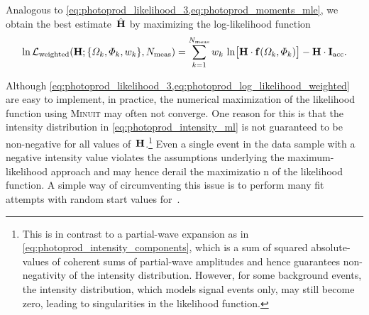 Analogous to
\cref{eq:photoprod_likelihood_3,eq:photoprod_moments_mle}, we obtain
the best estimate~$\hat{\bm{\mathrm{H}}}$ by maximizing the log-likelihood
function
\begin{equation}
  \label{eq:photoprod_log_likelihood_weighted}
  \ln \mathcal{L}_\text{weighted}(\vect{H}; \set{\Omega_k, \Phi_k, w_k}, N_\text{meas})
  = \sum_{k = 1}^{N_\text{meas}} w_k\, \ln\!\sBrk[1]{\vect{H} \cdot \vect{f}(\Omega_k, \Phi_k)}
  - \vect{H} \cdot \vect{I}_\text{acc}.
\end{equation}

Although
\cref{eq:photoprod_likelihood_3,eq:photoprod_log_likelihood_weighted}
are easy to implement, in practice, the numerical maximization of the
likelihood function using \textsc{Minuit} may often not converge.  One
reason for this is that the intensity distribution in
\cref{eq:photoprod_intensity_ml} is not guaranteed to be non-negative
for all values of~$\bm{\mathrm{H}}$.\footnote{This is in contrast to a
partial-wave expansion as in \cref{eq:photoprod_intensity_components},
which is a sum of squared absolute-values of coherent sums of
partial-wave amplitudes and hence guarantees non-negativity of the
intensity distribution.  However, for some background events, the
intensity distribution, which models signal events only, may still
become zero, leading to singularities in the likelihood function.}
Even a single event in the data sample with a negative intensity value
violates the assumptions underlying the maximum-likelihood approach
and may hence derail the maximizatio  n of the likelihood function.  A
simple way of circumventing this issue is to perform many fit attempts
with random start values for~.

